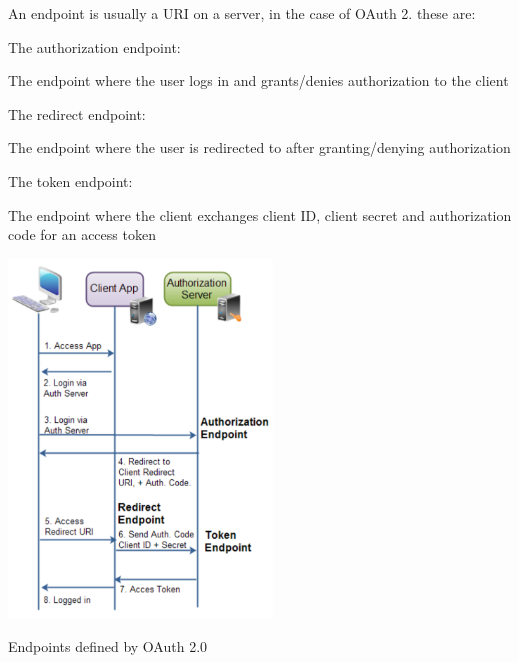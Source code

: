 \-An endpoint is usually a \-U\-R\-I on a server, in the case of \-O\-Auth 2. these are\-:
\begin{DoxyItemize}
\item \-The authorization endpoint\-: \par
 \-The endpoint where the user logs in and grants/denies authorization to the client \par
\par

\item \-The redirect endpoint\-: \par
 \-The endpoint where the user is redirected to after granting/denying authorization \par
\par

\item \-The token endpoint\-: \par
 \-The endpoint where the client exchanges client \-I\-D, client secret and authorization code for an access token \par
\par

\end{DoxyItemize}

 
\begin{DoxyImage}
\includegraphics[width=7cm]{endpoints}
\caption{\-Endpoints defined by \-O\-Auth 2.0}
\end{DoxyImage}
 